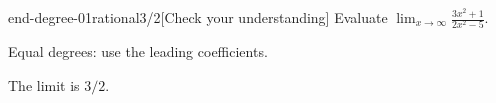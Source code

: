 \begin{bgcheck}{end-degree-01}{rational}{3/2}[Check your understanding]
Evaluate \(\lim_{x\to\infty}\frac{3x^2+1}{2x^2-5}\).
\begin{bghint}
Equal degrees: use the leading coefficients.
\end{bghint}
\begin{bgreveal}
The limit is \(3/2\).
\end{bgreveal}
\end{bgcheck}
